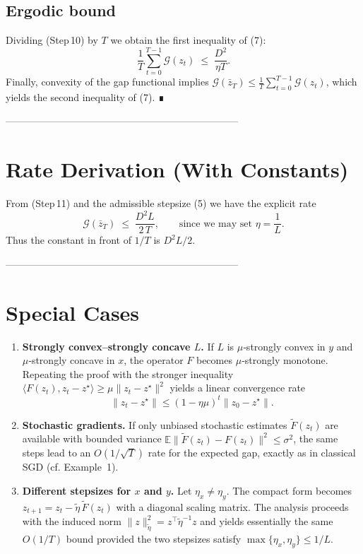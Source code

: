 \documentclass{article}
\newcommand{\E}{\mathbb{E}}
\begin{document}
\subsection*{Ergodic bound}
Dividing (Step 10) by $T$ we obtain the first inequality of (7):
\[
\frac1T\sum_{t=0}^{T-1}\mathcal G(z_t)\;\le\;\frac{D^{2}}{\eta T}.            \tag{Step 11}
\]
Finally, convexity of the gap functional implies
$\mathcal G(\bar z_T)\le\frac1T\sum_{t=0}^{T-1}\mathcal G(z_t)$,
which yields the second inequality of (7).  ∎

-----------------------------------------------------------------------

\section*{Rate Derivation (With Constants)}
From (Step 11) and the admissible stepsize (5) we have the explicit
rate
\[
\mathcal G(\bar z_T)\;\le\;\frac{D^{2}L}{2\,T},
\qquad\text{since we may set }\eta=\frac{1}{L}.
\tag{12}
\]
Thus the constant in front of $1/T$ is $D^{2}L/2$.

-----------------------------------------------------------------------

\section*{Special Cases}
\begin{enumerate}
\item \textbf{Strongly convex–strongly concave $L$.}  
If $L$ is $\mu$‑strongly convex in $y$ and $\mu$‑strongly concave in $x$,
the operator $F$ becomes $\mu$‑strongly monotone.
Repeating the proof with the stronger inequality
$\langle F(z_t),z_t-z^{\star}\rangle\ge\mu\|z_t-z^{\star}\|^{2}$
yields a linear convergence rate
\[
\|z_t-z^{\star}\|\le (1-\eta\mu)^{t}\|z_0-z^{\star}\|.
\]

\item \textbf{Stochastic gradients.}  
If only unbiased stochastic estimates $\tilde F(z_t)$ are available
with bounded variance $\E\|\tilde F(z_t)-F(z_t)\|^{2}\le\sigma^{2}$,
the same steps lead to an $O(1/\sqrt{T})$ rate for the expected gap,
exactly as in classical SGD (cf. Example 1).

\item \textbf{Different stepsizes for $x$ and $y$.}  
Let $\eta_x\neq\eta_y$.  The compact form becomes
$z_{t+1}=z_t-\tilde\eta\,\tilde F(z_t)$ with a diagonal scaling matrix.
The analysis proceeds with the induced norm
$\|z\|_{\tilde\eta}^{2}=z^{\top}\tilde\eta^{-1}z$ and yields essentially the
same $O(1/T)$ bound provided the two stepsizes satisfy
$\max\{\eta_x,\eta_y\}\le 1/L$.

\end{enumerate}
\end{document}
